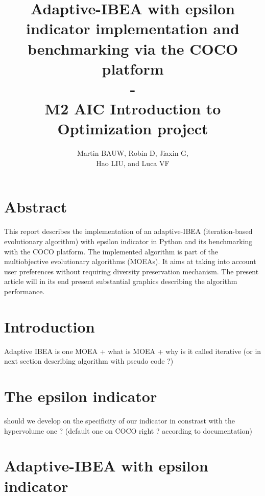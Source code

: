 \documentclass[12pt]{article}
\date{}
\begin{document}
\title{Adaptive-IBEA with epsilon indicator implementation and benchmarking via the COCO platform \\ \-- \\ M2 AIC Introduction to Optimization project}
\author{Martin BAUW, Robin D, Jiaxin G,\\ Hao LIU, and Luca VF}
\maketitle

\tableofcontents

\newpage

\section{Abstract}

This report describes the implementation of an adaptive-IBEA (iteration-based evolutionary algorithm) with epsilon indicator in Python and its benchmarking with the COCO platform. The implemented algorithm is part of the multiobjective evolutionary algorithms (MOEAs). It aims at taking into account user preferences without requiring diversity preservation mechanism. The present article will in its end present substantial graphics describing the algorithm performance.

\section{Introduction}

Adaptive IBEA is one MOEA + what is MOEA + why is it called iterative (or in next section describing algorithm with pseudo code ?)

\section{The epsilon indicator}

should we develop on the specificity of our indicator in constrast with the hypervolume one ? (default one on COCO right ? according to documentation)

\section{Adaptive-IBEA with epsilon indicator}

\end{document}
